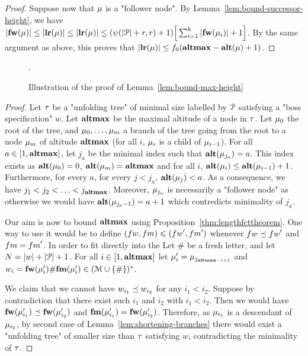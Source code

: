 \begin{proof}
	Suppose now that $\mu$ is a "follower node". By Lemma~\ref{lem:bound-successor-height}, we have 
	$|\mathbf{fw}(\mu)| \leq |\mathbf{lr}(\mu)| \leq |\mathbf{lr}(\mu)| \leq (\psi(|\mathcal{P}|+r,r)+1) \Big[\sum_{i=1}^k |\mathbf{fw}(\mu_i)|+1\Big]$.
	By the same argument as above, this proves that $|\mathbf{lr}(\mu)| \leq f_0(\mathbf{altmax} - \mathbf{alt}(\mu)+1)$.
\end{proof}

\begin{figure}
	
	\caption{Illustration of the proof of Lemma~\ref{lem:bound-max-height}}.
	\label{fig:max-height-bound}
\end{figure}

\lemBoundMaxHeight*

\begin{proof}
	Let $\tau$ be a "unfolding tree" of minimal size labelled by $\mathcal{P}$ satisfying a "boss specification" $w$. Let $\mathbf{altmax}$ be the maximal altitude of a node in $\tau$. Let $\mu_0$ the root of the tree, and  $\mu_0, \ldots, \mu_m$ a branch of the tree going from the root to a node $\mu_m$ of altitude $\mathbf{altmax}$ (for all $i$, $\mu_i$ is a child of $\mu_{i-1}$).
	For all $a \in [1,\mathbf{altmax}]$, let $j_a$ be the minimal index such that $\mathbf{alt}(\mu_{j_a}) = a$. This index exists as $\mathbf{alt}(\mu_0) = 0$, $\mathbf{alt}(\mu_m) = \mathbf{altmax}$ and for all $i$, $\mathbf{alt}(\mu_{i}) \leq \mathbf{alt}(\mu_{i-1})+1$.
	Furthermore, for every $a$, for every $j < j_a$, $\mathbf{alt}(\mu_j) < a$. 
	As a consequence, we have $j_1 < j_2 < \ldots < j_{\mathbf{altmax}}$. Moreover, $\mu_{j_a}$ is necessarily a "follower node" as otherwise we would have $\mathbf{alt}(\mu_{j_a-1}) = a+1$ which contredicts minimality of $j_a$.
	
	Our aim is now to bound $\mathbf{altmax}$ using Proposition~\ref{thm:lengthfcttheorem}. One way to use it would be to define $(\followwordspec, \followmessagespec) \leqslant (\followwordspec', \followmessagespec')$ whenever $\followwordspec \subword \followwordspec'$ and $\followmessagespec = \followmessagespec'$. In order to fit directly into the 
	Let $\#$ be a fresh letter, and let $N = |w| + |\mathcal{P}|+1$. For all $i \in [1,\mathbf{altmax}]$ let $\mu'_i = \mu_{j_{\mathbf{altmax} - i+1}}$ and $w_i = \mathbf{fw}(\mu'_{i}) \# \mathbf{fm}(\mu'_{i}) \in (\mathcal{M} \cup \{\#\})^*$.
	
	We claim that we cannot have $w_{i_1}\preceq w_{i_2}$ for any  $i_1< i_2$.
	Suppose by contradiction that there exist such $i_1$ and $i_2$ with $i_1 < i_2$. Then we would have $\mathbf{fw}(\mu'_{i_1}) \preceq \mathbf{fw}(\mu'_{i_2})$ and $\mathbf{fm}(\mu'_{i_1}) = \mathbf{fw}(\mu'_{i_2})$.
	Therefore, as $\mu_{i_1}$ is a descendant of $\mu_{i_2}$, by second case of Lemma~\ref{lem:shortening-branches} there would exist a "unfolding tree" of smaller size than $\tau$ satisfying $w$, contradicting the minimality of $\tau$.
	

\end{proof}
